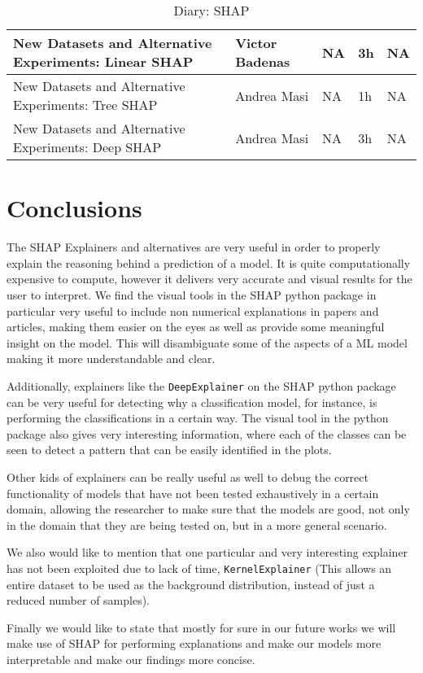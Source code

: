 \begin{table}[H]
{\begin{tabular}{|l|l|l|l|l|}
            New Datasets and Alternative Experiments: Linear SHAP & Victor Badenas & NA                 & 3h               & NA                \\ \hline
            New Datasets and Alternative Experiments: Tree SHAP   & Andrea Masi    & NA                 & 1h               & NA                \\ \hline
            New Datasets and Alternative Experiments: Deep SHAP   & Andrea Masi    & NA                 & 3h               & NA               \\ \hline
        \end{tabular}}
    \caption{Diary: SHAP}
    \label{SHAP-Subtask}
\end{table}

\section{Conclusions}

The SHAP Explainers and alternatives are very useful in order to properly explain the reasoning behind a prediction of a model. It is quite computationally expensive to compute, however it delivers very accurate and visual results for the user to interpret. We find the visual tools in the SHAP python package in particular very useful to include non numerical explanations in papers and articles, making them easier on the eyes as well as provide some meaningful insight on the model. This will disambiguate some of the aspects of a ML model making it more understandable and clear.

Additionally, explainers like the \texttt{DeepExplainer} on the SHAP python package can be very useful for detecting why a classification model, for instance, is performing the classifications in a certain way. The visual tool in the python package also gives very interesting information, where each of the classes can be seen to detect a pattern that can be easily identified in the plots.

Other kids of explainers can be really useful as well to debug the correct functionality of models that have not been tested exhaustively in a certain domain, allowing the researcher to make sure that the models are good, not only in the domain that they are being tested on, but in a more general scenario.

We also would like to mention that one particular and very interesting explainer has not been exploited due to lack of time, \texttt{KernelExplainer} (This allows an entire dataset to be used as the background distribution, instead of just a reduced number of samples).

Finally we would like to state that mostly for sure in our future works we will make use of SHAP for performing explanations and make our models more interpretable and make our findings more concise.
